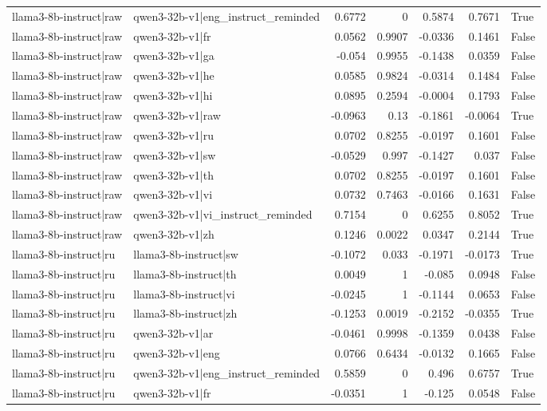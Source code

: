 \begin{table}
\begin{tabular}{l l r r r r l}
llama3-8b-instruct|raw & qwen3-32b-v1|eng_instruct_reminded & 0.6772 & 0 & 0.5874 & 0.7671 & True \\
llama3-8b-instruct|raw & qwen3-32b-v1|fr & 0.0562 & 0.9907 & -0.0336 & 0.1461 & False \\
llama3-8b-instruct|raw & qwen3-32b-v1|ga & -0.054 & 0.9955 & -0.1438 & 0.0359 & False \\
llama3-8b-instruct|raw & qwen3-32b-v1|he & 0.0585 & 0.9824 & -0.0314 & 0.1484 & False \\
llama3-8b-instruct|raw & qwen3-32b-v1|hi & 0.0895 & 0.2594 & -0.0004 & 0.1793 & False \\
llama3-8b-instruct|raw & qwen3-32b-v1|raw & -0.0963 & 0.13 & -0.1861 & -0.0064 & True \\
llama3-8b-instruct|raw & qwen3-32b-v1|ru & 0.0702 & 0.8255 & -0.0197 & 0.1601 & False \\
llama3-8b-instruct|raw & qwen3-32b-v1|sw & -0.0529 & 0.997 & -0.1427 & 0.037 & False \\
llama3-8b-instruct|raw & qwen3-32b-v1|th & 0.0702 & 0.8255 & -0.0197 & 0.1601 & False \\
llama3-8b-instruct|raw & qwen3-32b-v1|vi & 0.0732 & 0.7463 & -0.0166 & 0.1631 & False \\
llama3-8b-instruct|raw & qwen3-32b-v1|vi_instruct_reminded & 0.7154 & 0 & 0.6255 & 0.8052 & True \\
llama3-8b-instruct|raw & qwen3-32b-v1|zh & 0.1246 & 0.0022 & 0.0347 & 0.2144 & True \\
llama3-8b-instruct|ru & llama3-8b-instruct|sw & -0.1072 & 0.033 & -0.1971 & -0.0173 & True \\
llama3-8b-instruct|ru & llama3-8b-instruct|th & 0.0049 & 1 & -0.085 & 0.0948 & False \\
llama3-8b-instruct|ru & llama3-8b-instruct|vi & -0.0245 & 1 & -0.1144 & 0.0653 & False \\
llama3-8b-instruct|ru & llama3-8b-instruct|zh & -0.1253 & 0.0019 & -0.2152 & -0.0355 & True \\
llama3-8b-instruct|ru & qwen3-32b-v1|ar & -0.0461 & 0.9998 & -0.1359 & 0.0438 & False \\
llama3-8b-instruct|ru & qwen3-32b-v1|eng & 0.0766 & 0.6434 & -0.0132 & 0.1665 & False \\
llama3-8b-instruct|ru & qwen3-32b-v1|eng_instruct_reminded & 0.5859 & 0 & 0.496 & 0.6757 & True \\
llama3-8b-instruct|ru & qwen3-32b-v1|fr & -0.0351 & 1 & -0.125 & 0.0548 & False \\

\end{tabular}
\end{table}
